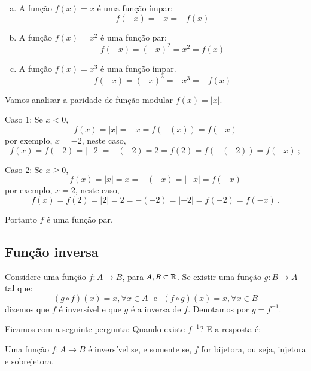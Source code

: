  \begin{exem}
  \begin{enumerate}[a)]
   \item A função $f(x)= x$ é uma função ímpar;
   \[f(-x)= -x= -f(x) \]
   \item A função $f(x)= x^2$ é uma função par;
   \[f(-x)= (-x)^2= x^2 = f(x) \]
   \item A função $f(x)= x^3$ é uma função ímpar.
   \[f(-x)= (-x)^3= -x^3= -f(x)\]
  \end{enumerate}
 \end{exem}

 \begin{exem}
  Vamos analisar a paridade de função modular $f(x)= |x|$.

  Caso 1: Se $x < 0$,
  \[f(x)= |x|= -x= f(-(x))= f(-x)\]
  por exemplo, $x= -2$, neste caso,
  \[f(x)= f(-2)= |-2|= -(-2)= 2= f(2)= f(-(-2))= f(-x) \ ;\]

  Caso 2: Se $x \geq 0$,
  \[f(x)= |x|= x= -(-x)= |-x|= f(-x)\]
  por exemplo, $x= 2$, neste caso,
  \[f(x)= f(2)= |2|= 2= -(-2)= |-2|= f(-2)= f(-x) \ .\]

  Portanto $f$ é uma função par.
 \end{exem}


  \subsection{Função inversa}

 Considere uma função $f: A \rightarrow B$, para $A, B \subset \mathbb{R}$. Se existir uma função $g: B \rightarrow A$ tal que:
 \[(g \circ f)(x)= x, \forall x \in A \ \ \ \text {e} \ \ \
 (f \circ g)(x)= x, \forall x \in B\]
 dizemos que $f$ é inversível e que $g$ é a inversa de $f$. Denotamos por $g= f^{-1}$.

 Ficamos com a seguinte pergunta: Quando existe $f^{-1}$? E a resposta é:

 \vskip0.3cm

 \colorbox{azul}{
 \begin{minipage}{0.9\linewidth}
 \begin{center}
 Uma função $f: A \to B$ é inversível se, e somente se, $f$ for bijetora, ou seja, injetora e sobrejetora.
 \end{center}
 \end{minipage}}

 \vskip0.3cm

